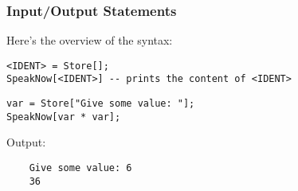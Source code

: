 \subsubsection{Input/Output Statements}
Here's the overview of the syntax:
\begin{verbatim}
<IDENT> = Store[];
SpeakNow[<IDENT>] -- prints the content of <IDENT>
\end{verbatim}
\begin{verbatim}
var = Store["Give some value: "];
SpeakNow[var * var];
\end{verbatim}
Output:
\begin{verbatim}
    Give some value: 6
    36
\end{verbatim}